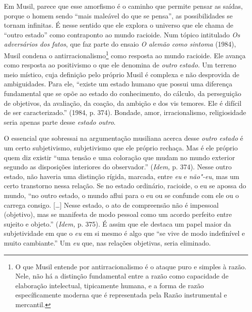 Em Musil, parece que esse amorfismo é o caminho que permite pensar as
saídas, porque o homem sendo ``mais maleável do que se pensa'', as
possibilidades se tornam infinitas. É nesse sentido que ele explora o
universo que ele chama de ``outro estado'' como contraponto ao mundo
racioide. Num tópico intitulado \emph{Os adversários dos fatos}, que faz
parte do ensaio \emph{O alemão como sintoma} (1984), Musil condena o
antirracionalismo\footnote{O que Musil entende por antirracionalismo é o
  ataque puro e simples à razão. Nele, não há a distinção fundamental
  entre a razão como capacidade de elaboração intelectual, tipicamente
  humana, e a forma de razão específicamente moderna que é representada
  pela Razão instrumental e mercantil.} como resposta ao mundo racioide.
Ele avança como resposta ao positivismo o que ele denomina de
\emph{outro} \emph{estado.} Um terreno meio místico, cuja definição pelo
próprio Musil é complexa e não desprovida de ambiguidades. Para ele,
``existe um estado humano que possui uma diferença fundamental que se
opõe ao estado do conhecimento, do cálculo, da perseguição de objetivos,
da avaliação, da coação, da ambição e dos vis temores. Ele é difícil de
ser caracterizado.'' (1984, p. 374). Bondade, amor, irracionalismo,
religiosidade seria apenas parte desse \emph{estado outro}.

O essencial que sobressai na argumentação musiliana acerca desse
\emph{outro estado} é um certo subjetivismo, subjetivismo que ele
próprio rechaça. Mas é ele próprio quem diz existir ``uma tensão e uma
coloração que mudam no mundo exterior segundo as disposições interiores
do observador.'' (\emph{Idem,} p. 374). Nesse outro estado, não haveria
uma distinção rígida, marcada, entre \emph{eu} e \emph{não"-eu}, mas um
certo transtorno nessa relação. Se no estado ordinário, racioide, o eu
se apossa do mundo, ``no outro estado, o mundo aflui para o eu ou se
confunde com ele ou o carrega consigo. [\ldots{}] Nesse estado, o
ato de compreensão não é impessoal (objetivo), mas se manifesta de modo
pessoal como um acordo perfeito entre sujeito e objeto.'' (\emph{Idem,}
p. 375). É assim que ele destaca um papel maior da subjetividade em que
o \emph{eu} em si mesmo é algo que ``se vive de modo indefinível e muito
cambiante.'' Um \emph{eu} que, nas relações objetivas, seria eliminado.

